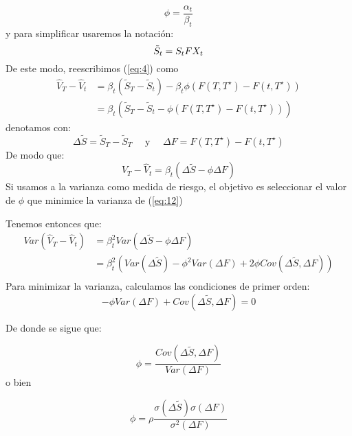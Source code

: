 \documentclass[12pt]{article}
\begin{document}
\begin{equation}
    \phi = \frac{\alpha_t}{\beta_t}
    \label{eq:8}
\end{equation}
y para simplificar usaremos la notación:
\begin{equation}
    \Tilde{S}_t = S_tFX_t
    \label{eq:9}
\end{equation}
De este modo, reescribimos (\ref{eq:4}) como
\begin{equation}
    \begin{split}
            \hat{V}_T - \hat{V}_t  & = \beta_t\left(\tilde{S}_T - \tilde{S}_t\right) - \beta_t\phi\left(F(T, T^\star) - F(t, T^\star)\right) \\
            & = \beta_t\left(\tilde{S}_T - \tilde{S}_t - \phi\left(F(T, T^\star) - F(t, T^\star)\right)\right)
    \end{split}
    \label{eq:10}
\end{equation}
denotamos con:
\begin{equation}
    \Delta \tilde{S} = \tilde{S}_T - \tilde{S}_T \quad \text{ y } \quad \Delta F = F(T, T^\star) - F(t, T^\star)
    \label{eq:11}
\end{equation}
De modo que:
\begin{equation}
    \hat{V}_T - \hat{V}_t = \beta_t\left(\Delta\tilde{S} - \phi\Delta F\right)
    \label{eq:12}
\end{equation}
Si usamos a la varianza como medida de riesgo, el objetivo es seleccionar el valor de $\phi$ que minimice la varianza de (\ref{eq:12})

Tenemos entonces que:
\begin{equation}
	\begin{split}
		Var\left(\hat{V}_T - \hat{V}_t\right) & = \beta^2_tVar\left(\Delta\tilde{S} - \phi\Delta F\right) \\ 
		                                      & = \beta^2_t \left(Var(\Delta\tilde{S}) - \phi^2Var(\Delta F) +2 \phi Cov(\Delta \tilde{S},\Delta F)\right) \\ 
	\end{split}
	\label{eq:13}
\end{equation}
Para minimizar la varianza, calculamos las condiciones de primer orden: 
\begin{equation}
	-\phi Var(\Delta F) +Cov(\Delta \tilde{S},\Delta F) = 0
	\label{eq:14}
\end{equation}

De donde se sigue que:

\begin{equation}
	\phi = \frac{Cov(\Delta \tilde{S},\Delta F)}{Var(\Delta F)} 
	\label{eq:15}
\end{equation}
o bien

\begin{equation}
	\phi = \rho\frac{\sigma(\Delta \tilde{S})\sigma(\Delta F)}{\sigma^2(\Delta F)} 
	\label{eq:16}
\end{equation}
\end{document}
